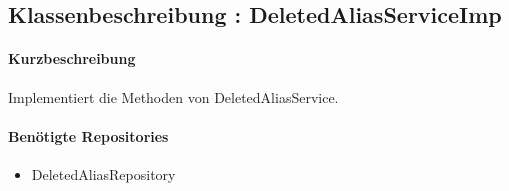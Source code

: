 \subsection*{Klassenbeschreibung : DeletedAliasServiceImp}%
\paragraph*{Kurzbeschreibung}
Implementiert die Methoden von DeletedAliasService.
\paragraph*{Benötigte Repositories}
\begin{itemize}
    \item DeletedAliasRepository
\end{itemize}